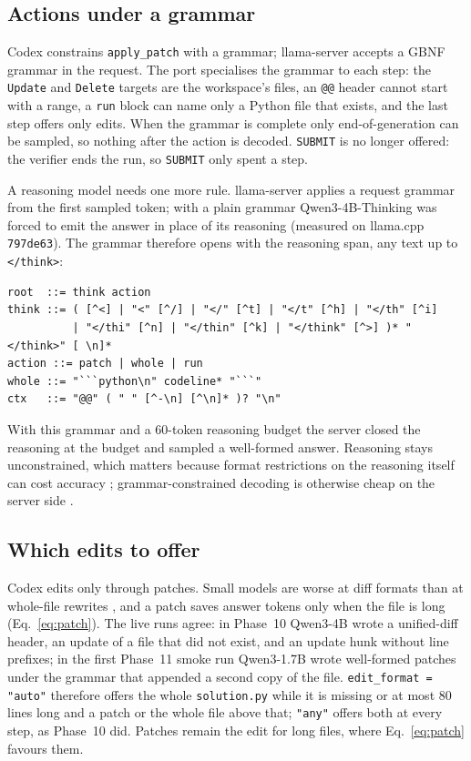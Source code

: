 \subsection{Actions under a grammar}

Codex constrains \texttt{apply\_patch} with a grammar; llama-server accepts a GBNF
grammar in the request. The port specialises the grammar to each step: the
\texttt{Update} and \texttt{Delete} targets are the workspace's files, an
\texttt{@@} header cannot start with a range, a \texttt{run} block can name only
a Python file that exists, and the last step offers only edits. When the grammar
is complete only end-of-generation can be sampled, so nothing after the action is
decoded. \texttt{SUBMIT} is no longer offered: the verifier ends the run, so
\texttt{SUBMIT} only spent a step.

A reasoning model needs one more rule. llama-server applies a request grammar
from the first sampled token; with a plain grammar Qwen3-4B-Thinking was forced to
emit the answer in place of its reasoning (measured on llama.cpp \texttt{797de63}).
The grammar therefore opens with the reasoning span, any text up to
\texttt{</think>}:
\begin{lstlisting}
root  ::= think action
think ::= ( [^<] | "<" [^/] | "</" [^t] | "</t" [^h] | "</th" [^i]
          | "</thi" [^n] | "</thin" [^k] | "</think" [^>] )* "</think>" [ \n]*
action ::= patch | whole | run
whole ::= "```python\n" codeline* "```"
ctx   ::= "@@" ( " " [^-\n] [^\n]* )? "\n"
\end{lstlisting}
With this grammar and a 60-token reasoning budget the server closed the reasoning
at the budget and sampled a well-formed answer. Reasoning stays unconstrained,
which matters because format restrictions on the reasoning itself can cost
accuracy \cite{tam2024speakfreely}; grammar-constrained decoding is otherwise
cheap on the server side \cite{willard2023outlines,dong2024xgrammar}.

\subsection{Which edits to offer}

Codex edits only through patches. Small models are worse at diff formats than at
whole-file rewrites \cite{diffxyz2025,aider2024editformats}, and a patch saves
answer tokens only when the file is long (Eq.~\ref{eq:patch}). The live runs
agree: in Phase~10 Qwen3-4B wrote a unified-diff header, an update of a file that
did not exist, and an update hunk without line prefixes; in the first Phase~11
smoke run Qwen3-1.7B wrote well-formed patches under the grammar that appended a
second copy of the file. \texttt{edit\_format = "auto"} therefore offers the
whole \texttt{solution.py} while it is missing or at most 80 lines long and a
patch or the whole file above that; \texttt{"any"} offers both at every step, as
Phase~10 did. Patches remain the edit for long files, where Eq.~\ref{eq:patch}
favours them.

